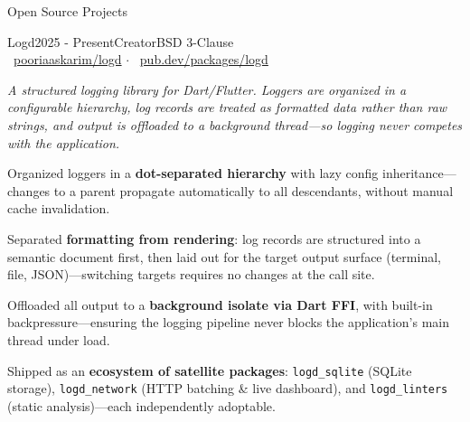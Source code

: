 \documentclass[
	a4paper, %
	12pt, %
]{resume} %
\begin{document}
\newpage

\begin{rSection}{Open Source Projects}
\hypertarget{opensource}{}
    \begin{rSubsection}{Logd}{2025 - Present}{Creator}{BSD 3-Clause 
		\\ {\footnotesize\textcolor{bluegray}{\faGithubAlt~\href{https://github.com/pooriaaskarim/logd}{pooriaaskarim/logd} $\cdot$ \faCube~\href{https://pub.dev/packages/logd}{pub.dev/packages/logd}}}}
		\item[] {\small\textit{A structured logging library for Dart/Flutter. Loggers are organized in a configurable hierarchy, log records are treated as formatted data rather than raw strings, and output is offloaded to a background thread---so logging never competes with the application.}}
		\item Organized loggers in a \textbf{dot-separated hierarchy} with lazy config inheritance---changes to a parent propagate automatically to all descendants, without manual cache invalidation.
		\item Separated \textbf{formatting from rendering}: log records are structured into a semantic document first, then laid out for the target output surface (terminal, file, JSON)---switching targets requires no changes at the call site.
		\item Offloaded all output to a \textbf{background isolate via Dart FFI}, with built-in backpressure---ensuring the logging pipeline never blocks the application's main thread under load.
		\item Shipped as an \textbf{ecosystem of satellite packages}: \texttt{logd\_sqlite} (SQLite storage), \texttt{logd\_network} (HTTP batching \& live dashboard), and \texttt{logd\_linters} (static analysis)---each independently adoptable.
        \\     
	\end{rSubsection}


\end{rSection}
\end{document}
